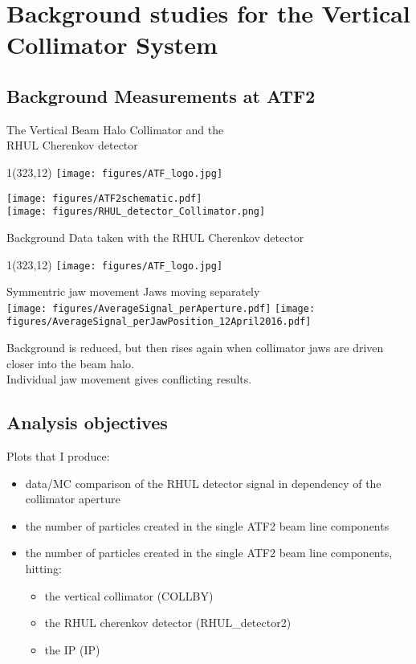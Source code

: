 \documentclass[xcolor={dvipsnames}]{beamer}
\newcommand{\ATFlogo}{
  \setlength{\TPHorizModule}{1pt}
  \setlength{\TPVertModule}{1pt}
  \begin{textblock}{1}(323,12)
   \texttt{[image: figures/ATF\_logo.jpg]}
  \end{textblock}
}
\begin{document}
\section{Background studies for the Vertical Collimator System}

\subsection{Background Measurements at ATF2}
\begin{frame}{The Vertical Beam Halo Collimator and the\\RHUL Cherenkov detector}
\ATFlogo
\begin{center}
\texttt{[image: figures/ATF2schematic.pdf]}\\
  \texttt{[image: figures/RHUL\_detector\_Collimator.png]}
\end{center}
\end{frame}

\begin{frame}{Background Data taken with the RHUL Cherenkov detector}
\ATFlogo
\begin{center}
 Symmentric jaw movement \hspace*{2.5cm} Jaws moving separately\\
\vspace*{0.2cm}
 \texttt{[image: figures/AverageSignal\_perAperture.pdf]}
  \texttt{[image: figures/AverageSignal\_perJawPosition\_12April2016.pdf]}
\end{center}
Background is reduced, but then rises again when collimator jaws are driven closer into the beam halo.\\
Individual jaw movement gives conflicting results.
\end{frame}

\subsection{Analysis objectives}
\begin{frame}
Plots that I produce:
 \begin{itemize}
  \item data/MC comparison of the RHUL detector signal in dependency of the collimator aperture
  \item the number of particles created in the single ATF2 beam line components
  \item the number of particles created in the single ATF2 beam line components, hitting:
  \begin{itemize}
   \item the vertical collimator (COLLBY)
   \item the RHUL cherenkov detector (RHUL\_detector2)
   \item the IP (IP)
  \end{itemize}
 \end{itemize}

\end{frame}
\end{document}
